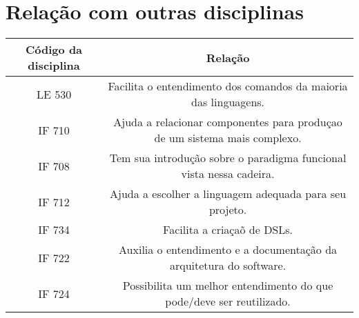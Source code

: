 \documentclass[10pt,a4paper]{article}
\begin{document}
\section{Relação com outras disciplinas}
\begin{center}
\begin {tabular}{|c|c|} 
\hline
Código da disciplina & Relação\\
\hline\hline
LE 530 & Facilita o entendimento dos comandos da maioria das linguagens. \\ 
\hline
IF 710& Ajuda a relacionar componentes para produçao de um sistema mais complexo.\\
\hline
IF 708 & Tem sua introdução sobre o paradigma funcional vista nessa cadeira. \\
\hline
IF 712& Ajuda a escolher a linguagem adequada para seu projeto. \\
\hline
IF 734& Facilita a criaçaõ de DSLs.\\
\hline
IF 722& Auxilia o entendimento e a documentação da arquitetura do software.\\
\hline
IF 724& Possibilita um melhor entendimento do que pode/deve ser reutilizado.\\
\hline
\end{tabular}
\end{center}


\nocite{CInWIKI}


\end{document}
